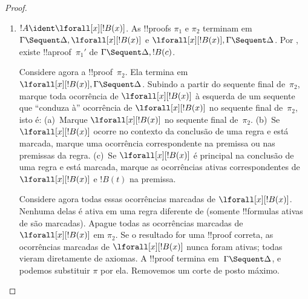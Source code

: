 \documentclass[../../../include/open-logic-section]{subfiles}
\begin{document}
\begin{proof}
\begin{enumerate}
  $\pi_2''$ de $!C, \Gamma \Sequent \Delta$. Aplicando
   a $\pi_2''$, obtemos também
  !!a{proof}~$\pi_2'''$ de $!C, !B, \Gamma \Sequent \Delta$. A
  !!{proof}~$\pi'$ é:
  \[
  \AxiomC{}
  \RightLabel{$\pi_2'$}
  \Deduce$\Gamma \fCenter \Delta, !B$
  \AxiomC{}
  \RightLabel{$\pi_1'$}
  \Deduce$!B, \Gamma \fCenter \Delta, !C$
  \AxiomC{}
  \RightLabel{$\pi_2'''$}
  \Deduce$!C, !B, \Gamma \fCenter \Delta$
  \RightLabel{\CutCS}
  \BinaryInf$!B, \Gamma \fCenter \Delta$
  \RightLabel{\CutCS}
  \BinaryInf$\Gamma \fCenter \Delta$
  \DisplayProof
  \]
  \item $!A \ident \lforall[x][!B(x)]$. As !!{proof}s $\pi_1$ e
  $\pi_2$ terminam em $\Gamma \Sequent \Delta, \lforall[x][!B(x)]$ e
  $\lforall[x][!B(x)], \Gamma \Sequent \Delta$. Por
  , existe !!a{proof}~$\pi_1'$ de $\Gamma
  \Sequent \Delta, !B(c)$.

  Considere agora a !!{proof}~$\pi_2$. Ela termina em $\lforall[x][!B(x)],
  \Gamma \Sequent \Delta$. Subindo a partir do sequente final
  de~$\pi_2$, marque toda ocorrência de $\lforall[x][!B(x)]$ à
  esquerda de um sequente que ``conduza à'' ocorrência de
  $\lforall[x][!B(x)]$ no sequente final de~$\pi_2$, isto é:
  (a)~Marque $\lforall[x][!B(x)]$ no sequente final de~$\pi_2$. (b)~Se
  $\lforall[x][!B(x)]$ ocorre no contexto da conclusão de uma
  regra e está marcada, marque uma ocorrência correspondente na premissa
  ou nas premissas da regra. (c)~Se $\lforall[x][!B(x)]$ é principal na
  conclusão de uma regra \LeftR{\lforall} e está marcada, marque as
  ocorrências ativas correspondentes de $\lforall[x][!B(x)]$ e $!B(t)$
  na premissa.
  
  Considere agora todas essas ocorrências marcadas de $\lforall[x][!B(x)]$.
  Nenhuma delas é ativa em uma regra diferente de \LeftR{\lforall} (somente
  !!{formula}s ativas de \LeftR{\lforall} são marcadas). Apague todas as
  ocorrências marcadas de $\lforall[x][!B(x)]$ em $\pi_2$.
  Se o resultado for uma !!{proof} correta, as ocorrências marcadas de
  $\lforall[x][!B(x)]$ nunca foram ativas; todas vieram diretamente de
  axiomas. A !!{proof} termina em~$\Gamma \Sequent \Delta$, e podemos
  substituir $\pi$ por ela. Removemos um corte de posto máximo.


\end{enumerate}
\end{proof}
\end{document}
